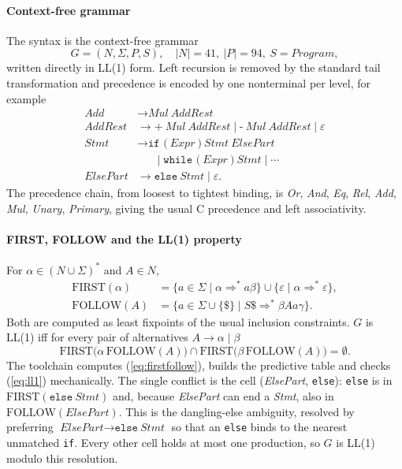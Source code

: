 \documentclass{ieeeaccess}
\newcommand{\First}{\mathrm{FIRST}}
\newcommand{\Follow}{\mathrm{FOLLOW}}
\newcommand{\nt}[1]{\textit{#1}}
\newcommand{\tm}[1]{\texttt{#1}}
\begin{document}
\paragraph*{Context-free grammar}
The syntax is the context-free grammar
\begin{equation}
G=(N,\Sigma,P,S),\quad |N|=41,\ |P|=94,\ S=\nt{Program},
\label{eq:grammar}
\end{equation}
written directly in LL(1) form. Left recursion is removed by the
standard tail transformation and precedence is encoded by one
nonterminal per level, for example
\begin{align*}
\nt{Add} &\to \nt{Mul}\ \nt{AddRest}\\
\nt{AddRest} &\to \tm{+}\ \nt{Mul}\ \nt{AddRest} \mid
                \tm{-}\ \nt{Mul}\ \nt{AddRest} \mid \varepsilon\\
\nt{Stmt} &\to \tm{if (}\ \nt{Expr}\ \tm{)}\ \nt{Stmt}\ \nt{ElsePart}\\
          &\phantom{{}\to{}} \mid \tm{while (}\ \nt{Expr}\ \tm{)}\ \nt{Stmt} \mid \cdots\\
\nt{ElsePart} &\to \tm{else}\ \nt{Stmt} \mid \varepsilon .
\end{align*}
The precedence chain, from loosest to tightest binding, is
\nt{Or}, \nt{And}, \nt{Eq}, \nt{Rel}, \nt{Add}, \nt{Mul}, \nt{Unary},
\nt{Primary}, giving the usual C precedence and left associativity.

\paragraph*{FIRST, FOLLOW and the LL(1) property}
For $\alpha\in(N\cup\Sigma)^\ast$ and $A\in N$,
\begin{equation}
\begin{aligned}
\First(\alpha) &= \{a\in\Sigma \mid \alpha \Rightarrow^\ast a\beta\}
                  \cup \{\varepsilon \mid \alpha\Rightarrow^\ast\varepsilon\},\\
\Follow(A) &= \{a\in\Sigma\cup\{\$\} \mid S\$ \Rightarrow^\ast \beta A a \gamma\}.
\end{aligned}
\label{eq:firstfollow}
\end{equation}
Both are computed as least fixpoints of the usual inclusion constraints.
$G$ is LL(1) iff for every pair of alternatives $A\to\alpha\mid\beta$
\begin{equation}
\First\big(\alpha\,\Follow(A)\big)\cap\First\big(\beta\,\Follow(A)\big)=\emptyset .
\label{eq:ll1}
\end{equation}
The toolchain computes (\ref{eq:firstfollow}), builds the predictive
table and checks (\ref{eq:ll1}) mechanically. The single conflict is
the cell (\nt{ElsePart}, \tm{else}): \tm{else} is in $\First(\tm{else}\
\nt{Stmt})$ and, because \nt{ElsePart} can end a \nt{Stmt}, also in
$\Follow(\nt{ElsePart})$. This is the dangling-else ambiguity, resolved
by preferring $\nt{ElsePart}\to\tm{else}\ \nt{Stmt}$ so that an
\tm{else} binds to the nearest unmatched \tm{if}. Every other cell holds
at most one production, so $G$ is LL(1) modulo this resolution.
\end{document}
